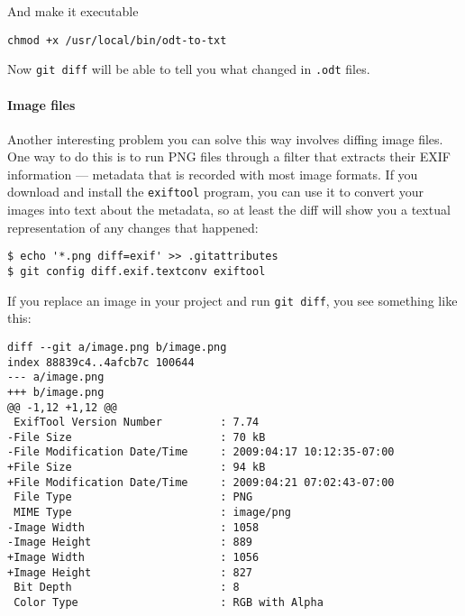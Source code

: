 \documentclass[a4paper]{book}
\newcounter{tab}[chapter]
\begin{document}
And make it executable

\begin{shaded}\begin{verbatim}
chmod +x /usr/local/bin/odt-to-txt
\end{verbatim}\end{shaded}

Now \texttt{git diff} will be able to tell you what changed in \texttt{.odt} files.

\paragraph{Image files}

Another interesting problem you can solve this way involves diffing image files. One way to do this is to run PNG files through a filter that extracts their EXIF information --- metadata that is recorded with most image formats. If you download and install the \texttt{exiftool} program, you can use it to convert your images into text about the metadata, so at least the diff will show you a textual representation of any changes that happened:

\begin{shaded}\begin{verbatim}
$ echo '*.png diff=exif' >> .gitattributes
$ git config diff.exif.textconv exiftool
\end{verbatim}\end{shaded}

If you replace an image in your project and run \texttt{git diff}, you see something like this:

\begin{shaded}\begin{verbatim}
diff --git a/image.png b/image.png
index 88839c4..4afcb7c 100644
--- a/image.png
+++ b/image.png
@@ -1,12 +1,12 @@
 ExifTool Version Number         : 7.74
-File Size                       : 70 kB
-File Modification Date/Time     : 2009:04:17 10:12:35-07:00
+File Size                       : 94 kB
+File Modification Date/Time     : 2009:04:21 07:02:43-07:00
 File Type                       : PNG
 MIME Type                       : image/png
-Image Width                     : 1058
-Image Height                    : 889
+Image Width                     : 1056
+Image Height                    : 827
 Bit Depth                       : 8
 Color Type                      : RGB with Alpha
\end{verbatim}\end{shaded}
\end{document}
